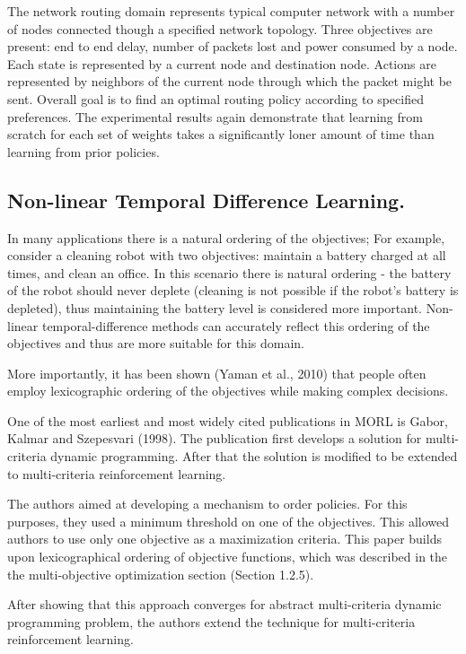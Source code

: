 The network routing domain represents typical computer network with a number of nodes connected though a specified network topology. Three objectives are present: end to end delay, number of packets lost and power consumed by a node. Each state is represented by a current node and destination node. Actions are represented by neighbors of the current node through which the packet might be sent. Overall goal is to find an optimal routing policy according to specified preferences. The experimental results again demonstrate that learning from scratch for each set of weights takes a significantly loner amount of time than learning from prior policies.\\

\subsection{Non-linear Temporal Difference Learning.}

In many applications there is a natural ordering of the objectives; For example, consider a cleaning robot with two objectives: maintain a battery charged at all times, and clean an office. In this scenario there is natural ordering - the battery of the robot should never deplete (cleaning is not possible if the robot's battery is depleted), thus maintaining the battery level is considered more important. Non-linear temporal-difference methods can accurately reflect this ordering of the objectives and thus are more suitable for this domain.

More importantly, it has been shown (Yaman et al., 2010\nocite{Yaman20111290}) that people often employ lexicographic ordering of the objectives while making complex decisions.

One of the most earliest and most widely cited publications in MORL is Gabor, Kalmar and Szepesvari (1998)\nocite{gabor1998multi}. The publication first develops a solution for multi-criteria dynamic programming. After that the solution is modified to be extended to multi-criteria reinforcement learning.

The authors aimed at developing a mechanism to order policies. For this purposes, they used a minimum threshold on one of the objectives. This allowed authors to use only one objective as a maximization criteria. This paper builds upon lexicographical ordering of objective functions, which was described in the the multi-objective optimization section (Section 1.2.5).

After showing that this approach converges for abstract multi-criteria dynamic programming problem, the authors extend the technique for multi-criteria reinforcement learning.

